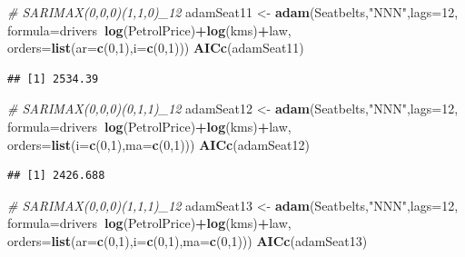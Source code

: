 \documentclass[]{book}
\newenvironment{Shaded}{\begin{snugshade}}{\end{snugshade}}
\newcommand{\CommentTok}[1]{\textcolor[rgb]{0.56,0.35,0.01}{\textit{#1}}}
\newcommand{\DataTypeTok}[1]{\textcolor[rgb]{0.13,0.29,0.53}{#1}}
\newcommand{\DecValTok}[1]{\textcolor[rgb]{0.00,0.00,0.81}{#1}}
\newcommand{\KeywordTok}[1]{\textcolor[rgb]{0.13,0.29,0.53}{\textbf{#1}}}
\newcommand{\NormalTok}[1]{#1}
\newcommand{\OperatorTok}[1]{\textcolor[rgb]{0.81,0.36,0.00}{\textbf{#1}}}
\newcommand{\StringTok}[1]{\textcolor[rgb]{0.31,0.60,0.02}{#1}}
\theoremstyle{definition}
\theoremstyle{definition}
\theoremstyle{definition}
\theoremstyle{definition}
\theoremstyle{remark}
\begin{document}
\begin{Shaded}
\begin{Highlighting}[]
\CommentTok{# SARIMAX(0,0,0)(1,1,0)_12}
\NormalTok{adamSeat11 <-}\StringTok{ }\KeywordTok{adam}\NormalTok{(Seatbelts,}\StringTok{"NNN"}\NormalTok{,}\DataTypeTok{lags=}\DecValTok{12}\NormalTok{,}
                   \DataTypeTok{formula=}\NormalTok{drivers}\OperatorTok{~}\KeywordTok{log}\NormalTok{(PetrolPrice)}\OperatorTok{+}\KeywordTok{log}\NormalTok{(kms)}\OperatorTok{+}\NormalTok{law,}
                   \DataTypeTok{orders=}\KeywordTok{list}\NormalTok{(}\DataTypeTok{ar=}\KeywordTok{c}\NormalTok{(}\DecValTok{0}\NormalTok{,}\DecValTok{1}\NormalTok{),}\DataTypeTok{i=}\KeywordTok{c}\NormalTok{(}\DecValTok{0}\NormalTok{,}\DecValTok{1}\NormalTok{)))}
\KeywordTok{AICc}\NormalTok{(adamSeat11)}
\end{Highlighting}
\end{Shaded}

\begin{verbatim}
## [1] 2534.39
\end{verbatim}

\begin{Shaded}
\begin{Highlighting}[]
\CommentTok{# SARIMAX(0,0,0)(0,1,1)_12}
\NormalTok{adamSeat12 <-}\StringTok{ }\KeywordTok{adam}\NormalTok{(Seatbelts,}\StringTok{"NNN"}\NormalTok{,}\DataTypeTok{lags=}\DecValTok{12}\NormalTok{,}
                   \DataTypeTok{formula=}\NormalTok{drivers}\OperatorTok{~}\KeywordTok{log}\NormalTok{(PetrolPrice)}\OperatorTok{+}\KeywordTok{log}\NormalTok{(kms)}\OperatorTok{+}\NormalTok{law,}
                   \DataTypeTok{orders=}\KeywordTok{list}\NormalTok{(}\DataTypeTok{i=}\KeywordTok{c}\NormalTok{(}\DecValTok{0}\NormalTok{,}\DecValTok{1}\NormalTok{),}\DataTypeTok{ma=}\KeywordTok{c}\NormalTok{(}\DecValTok{0}\NormalTok{,}\DecValTok{1}\NormalTok{)))}
\KeywordTok{AICc}\NormalTok{(adamSeat12)}
\end{Highlighting}
\end{Shaded}

\begin{verbatim}
## [1] 2426.688
\end{verbatim}

\begin{Shaded}
\begin{Highlighting}[]
\CommentTok{# SARIMAX(0,0,0)(1,1,1)_12}
\NormalTok{adamSeat13 <-}\StringTok{ }\KeywordTok{adam}\NormalTok{(Seatbelts,}\StringTok{"NNN"}\NormalTok{,}\DataTypeTok{lags=}\DecValTok{12}\NormalTok{,}
                   \DataTypeTok{formula=}\NormalTok{drivers}\OperatorTok{~}\KeywordTok{log}\NormalTok{(PetrolPrice)}\OperatorTok{+}\KeywordTok{log}\NormalTok{(kms)}\OperatorTok{+}\NormalTok{law,}
                   \DataTypeTok{orders=}\KeywordTok{list}\NormalTok{(}\DataTypeTok{ar=}\KeywordTok{c}\NormalTok{(}\DecValTok{0}\NormalTok{,}\DecValTok{1}\NormalTok{),}\DataTypeTok{i=}\KeywordTok{c}\NormalTok{(}\DecValTok{0}\NormalTok{,}\DecValTok{1}\NormalTok{),}\DataTypeTok{ma=}\KeywordTok{c}\NormalTok{(}\DecValTok{0}\NormalTok{,}\DecValTok{1}\NormalTok{)))}
\KeywordTok{AICc}\NormalTok{(adamSeat13)}
\end{Highlighting}
\end{Shaded}
\end{document}
